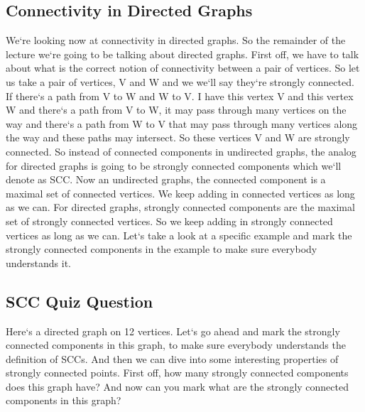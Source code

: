 \subsection{Connectivity in Directed Graphs}
We`re looking now at connectivity in directed graphs.
So the remainder of the lecture we`re going to be talking about directed graphs.
First off, we have to talk about what is the correct notion of connectivity between a pair of vertices.
So let us take a pair of vertices, V and W and we we`ll say they`re strongly connected.
If there`s a path from V to W and W to V\@.
I have this vertex V and this vertex W and there`s a path from V to W, it may pass through many vertices on the way and there`s a path from W to V that may pass through many vertices along the way and these paths may intersect.
So these vertices V and W are strongly connected.
So instead of connected components in undirected graphs, the analog for directed graphs is going to be strongly connected components which we`ll denote as SCC\@.
Now an undirected graphs, the connected component is a maximal set of connected vertices.
We keep adding in connected vertices as long as we can.
For directed graphs, strongly connected components are the maximal set of strongly connected vertices.
So we keep adding in strongly connected vertices as long as we can.
Let`s take a look at a specific example and mark the strongly connected components in the example to make sure everybody understands it.

\subsection{SCC Quiz Question}
Here`s a directed graph on 12 vertices.
Let`s go ahead and mark the strongly connected components in this graph, to make sure everybody understands the definition of SCCs.
And then we can dive into some interesting properties of strongly connected points.
First off, how many strongly connected components does this graph have? And now can you mark what are the strongly connected components in this graph?

